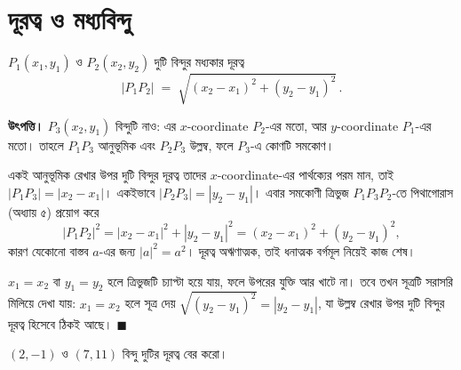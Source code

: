 \documentclass[11pt]{article}
\begin{document}
\section{দূরত্ব ও মধ্যবিন্দু}

\begin{idea}[দূরত্ব]
$P_1(x_1, y_1)$ ও $P_2(x_2, y_2)$ দুটি বিন্দুর মধ্যকার দূরত্ব
\[
  |P_1 P_2| \;=\; \sqrt{(x_2 - x_1)^2 + (y_2 - y_1)^2}\,.
\]
\end{idea}

\noindent
\textbf{উৎপত্তি।} $P_3(x_2, y_1)$ বিন্দুটি নাও: এর $x$-coordinate $P_2$-এর
মতো, আর $y$-coordinate $P_1$-এর মতো। তাহলে $P_1 P_3$ আনুভূমিক এবং $P_2 P_3$
উল্লম্ব, ফলে $P_3$-এ কোণটি সমকোণ।

একই আনুভূমিক রেখার উপর দুটি বিন্দুর দূরত্ব তাদের $x$-coordinate-এর পার্থক্যের
পরম মান, তাই $|P_1 P_3| = |x_2 - x_1|$। একইভাবে $|P_2 P_3| = |y_2 - y_1|$।
এবার সমকোণী ত্রিভুজ $P_1 P_3 P_2$-তে পিথাগোরাস (অধ্যায় ৫) প্রয়োগ করে
\[
  |P_1 P_2|^2 = |x_2 - x_1|^2 + |y_2 - y_1|^2 = (x_2 - x_1)^2 + (y_2 - y_1)^2 ,
\]
কারণ যেকোনো বাস্তব $a$-এর জন্য $|a|^2 = a^2$। দূরত্ব অঋণাত্মক, তাই ধনাত্মক
বর্গমূল নিয়েই কাজ শেষ।

$x_1 = x_2$ বা $y_1 = y_2$ হলে ত্রিভুজটি চ্যাপ্টা হয়ে যায়, ফলে উপরের যুক্তি
আর খাটে না। তবে তখন সূত্রটি সরাসরি মিলিয়ে দেখা যায়: $x_1 = x_2$ হলে সূত্র দেয়
$\sqrt{(y_2-y_1)^2} = |y_2 - y_1|$, যা উল্লম্ব রেখার উপর দুটি বিন্দুর দূরত্ব
হিসেবে ঠিকই আছে। $\blacksquare$

\begin{center}
\end{center}

\begin{example}
$(2, -1)$ ও $(7, 11)$ বিন্দু দুটির দূরত্ব বের করো।
\end{example}
\end{document}
